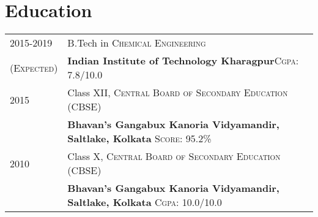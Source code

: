 \documentclass[a4paper,11pt]{extarticle} %
\begin{document}



\section{Education}

\begin{tabular}{R{3.0cm}|p{15.0cm}}	
2015-2019 & B.Tech in \textsc{Chemical Engineering}\\
\textsc{(Expected)}&\textbf{Indian Institute of Technology Kharagpur}\hfill\textsc{Cgpa}: 7.8/10.0\\



2015& Class XII, \textsc{}\textsc{Central Board of Secondary Education (CBSE)} \\
&\normalsize\textbf{Bhavan's Gangabux Kanoria Vidyamandir, Saltlake, Kolkata} \hfill\textsc{Score}: 95.2\%\\



2010 & Class X, \textsc{}\textsc{Central Board of Secondary Education (CBSE)} \\
&\normalsize\textbf{Bhavan's Gangabux Kanoria Vidyamandir, Saltlake, Kolkata} \hfill\textsc{Cgpa}: 10.0/10.0\\

\end{tabular}

\end{document}
